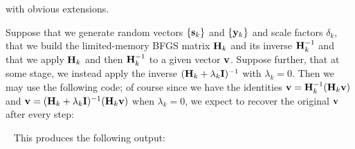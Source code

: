 \documentclass{galahad}
\begin{document}
\noindent
with obvious extensions.


\galexample
Suppose that we generate random vectors $\{{\mathbf{s}}_k\}$ and $\{{\mathbf{y}}_k\}$
and scale factors $\delta_k$, that we build the limited-memory BFGS
matrix ${\mathbf{H}}_k$ and its inverse ${\mathbf{H}}_k^{-1}$ and that we apply
${\mathbf{H}}_k$ and then ${\mathbf{H}}_k^{-1}$ to a given vector ${\mathbf{v}}$. Suppose further,
that at some stage, we instead apply the inverse $({\mathbf{H}}_k+\lambda_k{\mathbf{I}})^{-1}$
with $\lambda_k = 0$. Then we may use the following code; of course since
we have the identities ${\mathbf{v}} = {\mathbf{H}}_k^{-1} ( {\mathbf{H}}_k {\mathbf{v}} )$ and
${\mathbf{v}} = ( {\mathbf{H}}_k + \lambda_k {\mathbf{I}}) ^{-1} ( {\mathbf{H}}_k {\mathbf{v}} )$ when $\lambda_k = 0$,
we expect to recover the original ${\mathbf{v}}$ after every step:

{\tt \small
\VerbatimInput{\packageexample}
}
\noindent
This produces the following output:
{\tt \small
\VerbatimInput{\packageresults}
}
\end{document}
